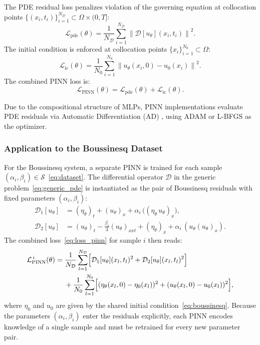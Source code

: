 The PDE residual loss penalizes violation of the governing equation at collocation points $\{(x_i,t_i)\}_{i=1}^{N_\mathcal{D}} \subset \Omega \times (0,T]$:
\begin{equation}
    \mathcal{L}_{\text{pde}}(\theta) = \frac{1}{N_\mathcal{D}}\sum_{i=1}^{N_\mathcal{D}}
    \left\| \mathcal{D}[u_\theta](x_i,t_i)\right\|^2.
\end{equation}
The initial condition is enforced at collocation points $\{x_i\}_{i=1}^{N_0} \subset \Omega$:
\begin{equation}
    \mathcal{L}_{\text{ic}}(\theta) = \frac{1}{N_0}\sum_{i=1}^{N_0}
    \left\| u_\theta(x_i,0) - u_0(x_i) \right\|^2.
\end{equation}
The combined PINN loss is:
\begin{equation}\label{eq:loss_pinn}
    \mathcal{L}_{\text{PINN}}(\theta) = \mathcal{L}_{\text{pde}}(\theta) + \mathcal{L}_{\text{ic}}(\theta).
\end{equation}

Due to the compositional structure of MLPs, PINN implementations evaluate PDE residuals via Automatic Differentiation (AD) \parencite{linnainmaa1970, paszke2019pytorch}, using ADAM \parencite{kingma2014adam} or L-BFGS \parencite{nocedal1980lbfgs} as the optimizer.

\subsubsection{Application to the Boussinesq Dataset}
\label{subsubsec:pinn_loss_boussinesq}

For the Boussinesq system, a separate PINN is trained for each sample $(\alpha_i,\beta_i) \in \mathcal{S}$~\eqref{eq:dataset}. The differential operator $\mathcal{D}$ in the generic problem~\eqref{eq:generic_pde} is instantiated as the pair of Boussinesq residuals with fixed parameters $(\alpha_i,\beta_i)$:
\begin{align}
    \mathcal{D}_1[u_\theta] &= (\eta_\theta)_t + (u_\theta)_x + \alpha_i\,\bigl((\eta_\theta\,u_\theta)_x\bigr), \\
    \mathcal{D}_2[u_\theta] &= (u_\theta)_t - \tfrac{\beta_i}{3}(u_\theta)_{xxt} + (\eta_\theta)_x + \alpha_i\,(u_\theta(u_\theta)_x).
\end{align}
The combined loss~\eqref{eq:loss_pinn} for sample $i$ then reads:
\begin{equation}\label{eq:pinn_loss_boussinesq}
    \begin{aligned}
        \mathcal{L}_{\text{PINN}}^{\,i}(\theta) ={}
        & \frac{1}{N_\mathcal{D}}\sum_{l=1}^{N_\mathcal{D}}
        \Bigl[\mathcal{D}_1[u_\theta](x_l,t_l)^2 + \mathcal{D}_2[u_\theta](x_l,t_l)^2\Bigr] \\
        & + \frac{1}{N_0}\sum_{l=1}^{N_0}
        \Bigl[(\eta_\theta(x_l,0)-\eta_0(x_l))^2 + (u_\theta(x_l,0)-u_0(x_l))^2\Bigr],
    \end{aligned}
\end{equation}
where $\eta_0$ and $u_0$ are given by the shared initial condition~\eqref{eq:boussinesq}. Because the parameters $(\alpha_i,\beta_i)$ enter the residuals explicitly, each PINN encodes knowledge of a single sample and must be retrained for every new parameter pair.

